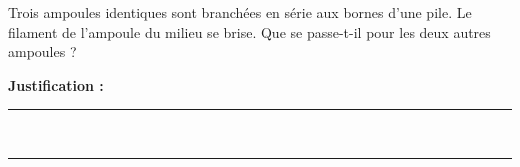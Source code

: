 Trois ampoules identiques sont branchées en série aux bornes d'une pile. Le filament de l'ampoule du milieu se brise. Que se passe-t-il pour les deux autres ampoules ?

\choices

\noindent\textbf{Justification :} \hrulefill \\[2.5ex]
\rule{\linewidth}{0.4pt} \\[2.5ex]
\rule{\linewidth}{0.4pt}
\vfill
